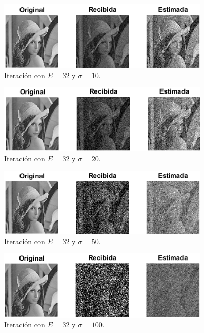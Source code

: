 \documentclass[a4paper]{article}
\begin{document}
\begin{itemize}
	\begin{figure}[H]
		\centering		
		\includegraphics[width=0.9\textwidth]{E32S10.png}
		\caption{Iteración con $ E = 32 $ y $ \sigma = 10 $.}
	\end{figure}		
	\begin{figure}[H]
		\centering		
		\includegraphics[width=0.9\textwidth]{E32S20.png}
		\caption{Iteración con $ E = 32 $ y $ \sigma = 20 $.}
	\end{figure}		
	\begin{figure}[H]
		\centering	
		\includegraphics[width=0.9\textwidth]{E32S50.png}
		\caption{Iteración con $ E = 32 $ y $ \sigma = 50 $.}
	\end{figure}		
	\begin{figure}[H]
		\centering		
		\includegraphics[width=0.9\textwidth]{E32S100.png}
		\caption{Iteración con $ E = 32 $ y $ \sigma = 100 $.}
	\end{figure}
	

\end{itemize}
\end{document}
